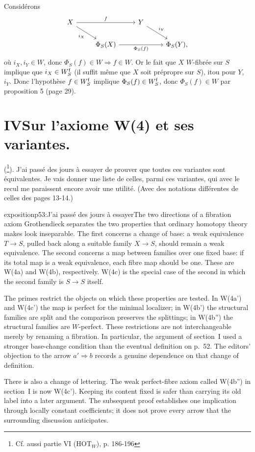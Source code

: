 Considérons
\[ \begin{tikzcd}
X \arrow[rr, "f"] \arrow[dr, "i_X"'] & & Y \arrow[dr, "i_Y"] & \\
 & \Phi_S(X) \arrow[rr, "\Phi_S(f)"'] & & \Phi_S(Y),
\end{tikzcd} \]
où $i_X, i_Y \in W$, donc $\Phi_S(f) \in W \Rightarrow f \in W$. Or le fait que $X$ $W$-fibrée sur $S$ implique que $i_X \in W^{\mathrm{f}}_S$ (il suffit même que $X$ soit prépropre sur $S$), itou pour $Y$, $i_Y$. Donc l'hypothèse $f \in W^{\mathrm{f}}_S$ implique $\Phi_S(f) \in W^{\mathrm{f}}_S$, donc $\Phi_S(f) \in W$ par proposition 5 (page 29).



\section*{IV\quad Sur l'axiome W(4) et ses variantes.}

(\footnote[60]{Cf. aussi partie VI (HOT$_W$), p. 186-196}). J'ai passé des jours à essayer de prouver que toutes ces variantes sont équivalentes. Je vais donner une liste de celles, parmi ces variantes, qui avec le recul me paraissent encore avoir une utilité. (Avec des notations différentes de celles des pages 13-14.)

\begin{dcomment}{exposition}{p53:J'ai passé des jours à essayer}{The two directions of a fibration axiom}
Grothendieck separates the two properties that ordinary homotopy theory makes look inseparable. The first concerns a change of base: a weak equivalence $T\to S$, pulled back along a suitable family $X\to S$, should remain a weak equivalence. The second concerns a map between families over one fixed base: if its total map is a weak equivalence, each fibre map should be one. These are W(4a) and W(4b), respectively. W(4c) is the special case of the second in which the second family is $S\to S$ itself.

The primes restrict the objects on which these properties are tested. In W(4a') and W(4c') the map is perfect for the minimal localizer; in W(4b') the structural families are split and the comparison preserves the splittings; in W(4b'') the structural families are $W$-perfect. These restrictions are not interchangeable merely by renaming a fibration. In particular, the argument of section~I used a stronger base-change condition than the eventual definition on p.~52. The editors' objection to the arrow $a'\Rightarrow b$ records a genuine dependence on that change of definition.

There is also a change of lettering. The weak perfect-fibre axiom called W(4b'') in section~I is now W(4c'). Keeping its content fixed is safer than carrying its old label into a later argument. The subsequent proof establishes one implication through locally constant coefficients; it does not prove every arrow that the surrounding discussion anticipates.
\end{dcomment}


